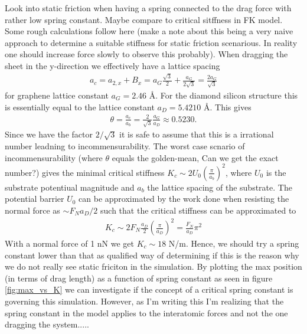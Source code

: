 Look into static friction when having a spring connected to the drag force with
rather low spring constant. Maybe compare to critical sitffness in FK model.
Some rough calculations follow here (make a note about this being a very naive
approach to determine a suitable stiffness for static friction scenarious. In
reality one should increase force slowly to observe this probably). When
dragging the sheet in the y-direction we effectively have a lattice spacing
\begin{align*}
  a_c = a_{2,x} + B_x = a_G\frac{\sqrt{3}}{2} + \frac{a_G}{2\sqrt{3}} = \frac{2a_G}{\sqrt{3}}
\end{align*}
for graphene lattice constant $a_G = 2.46$ Å. For the diamond silicon structure
this is essentially equal to the lattice constant $a_D = 5.4210$ Å. This gives 
\begin{align*}
  \theta = \frac{a_c}{a_b} = \frac{2}{\sqrt{3}}\frac{a_G}{a_D} \approx 0.5230.
\end{align*}
Since we have the factor $2/\sqrt{3}$ it is safe to assume that this is a
irrational number leadning to incommensurability. The worst case scnario of
incommensurability (where $\theta$ equals the golden-mean, Can we get the exact
number?) gives the minimal critical stiffness $K_c \sim 2U_0
(\frac{\pi}{a_b})^2$, where $U_0$ is the substrate potentiual magnitude and
$a_b$ the lattice spacing of the substrate. The potential barrier $U_0$ can be
approximated by the work done when resisting the normal force as $\sim F_N
a_D/2$ such that the critical stiffness can be approximated to 
\begin{align*}
  K_c \sim 2 F_N \frac{a_D}{2} \left(\frac{\pi}{a_D}\right)^2 = \frac{F_N}{a_D}\pi^2
\end{align*}
With a normal force of 1 nN we get $K_c \sim 18$ N/m. Hence, we should try a
spring constant lower than that as qualified way of determining if this is the
reason why we do not really see static friciton in the simulation. By plotting the max position (in terms of drag length) as a function of spring constant as seen in figure \ref{fig:max_vs_K} we can investigate if the concept of a critical spring constant is governing this simulation. However, as I'm writing this I'm realizing that the spring constant in the model applies to the interatomic forces and not the one dragging the system.....


